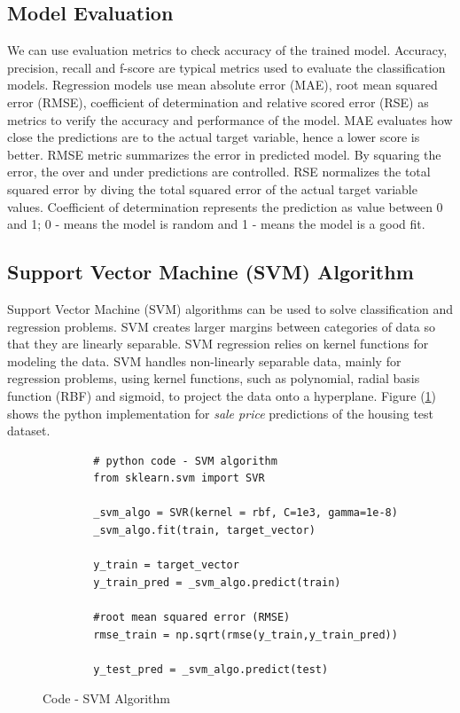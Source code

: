 \documentclass[sigconf]{acmart}
\begin{document}
	\subsection{Model Evaluation}
	We can use evaluation metrics to check accuracy of the trained model. Accuracy, precision, recall and f-score are typical metrics used to evaluate the classification models. Regression models use mean absolute error (MAE), root mean squared error (RMSE), coefficient of determination and relative scored error (RSE) as metrics to verify the accuracy and performance of the model. MAE evaluates how close the predictions are to the actual target variable, hence a lower score is better. RMSE metric summarizes the error in predicted model. By squaring the error, the over and under predictions are controlled. RSE normalizes the total squared error by diving the total squared error of the actual target variable values. Coefficient of determination represents the prediction as value between 0 and 1; 0 - means the model is random and 1 - means the model is a good fit.
	
	\subsection{Support Vector Machine (SVM) Algorithm}
	
	Support Vector Machine (SVM) algorithms can be used to solve classification and regression problems. SVM creates larger margins between categories of data so that they are linearly separable. SVM regression relies on kernel functions for modeling the data. SVM handles non-linearly separable data, mainly for regression problems, using kernel functions, such as polynomial, radial basis function (RBF) and sigmoid, to project the data onto a hyperplane. Figure (\ref{c:svm}) shows the python implementation for {\em sale price} predictions of the housing test dataset.
	
	\begin{figure}[htb]	
		\begin{verbatim}	
		# python code - SVM algorithm
		from sklearn.svm import SVR	
		
		_svm_algo = SVR(kernel = rbf, C=1e3, gamma=1e-8)		
		_svm_algo.fit(train, target_vector)    
		
		y_train = target_vector
		y_train_pred = _svm_algo.predict(train)
		
		#root mean squared error (RMSE)
		rmse_train = np.sqrt(rmse(y_train,y_train_pred))
		
		y_test_pred = _svm_algo.predict(test)	
		\end{verbatim}
		\caption{Code - SVM Algorithm} \label{c:svm} 
	\end{figure}
	
\end{document}

